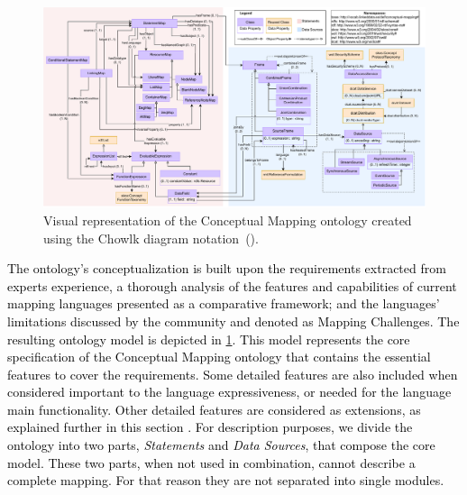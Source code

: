 \begin{figure}
    \centering
    \includegraphics[width=1\linewidth]{figures/cm_diagram}
    \caption{Visual representation of the Conceptual Mapping ontology created using the Chowlk diagram notation~(\cite{feria2022chowlk}).}
    \label{fig:cm_diagram}
\end{figure}

\textcolor{black}{The ontology's conceptualization is built upon the requirements extracted from experts experience, a thorough analysis of the features and capabilities of current mapping languages presented as a comparative framework; and the languages' limitations discussed by the community and denoted as Mapping Challenges. The resulting ontology model is depicted in \cref{fig:cm_diagram}. This model represents the core specification of the Conceptual Mapping ontology that contains the essential features to cover the requirements. Some detailed features are also included when considered important to the language expressiveness, or needed for the language main functionality. Other detailed features are considered as extensions, as explained further in this section . For description purposes, we divide the ontology into two parts, \textit{Statements} and \textit{Data Sources}, that compose the core model. These two parts, when not used in combination, cannot describe a complete mapping. For that reason they are not separated into single modules. } 

